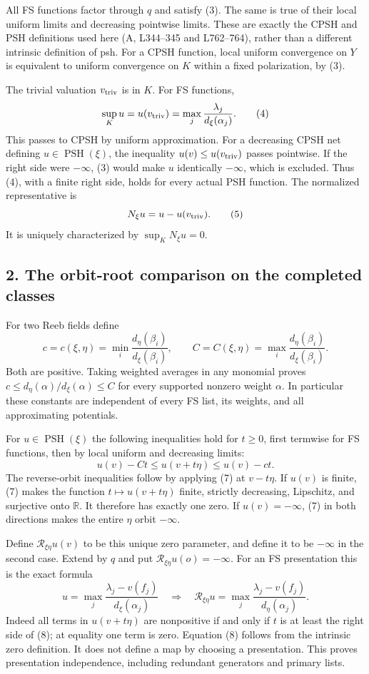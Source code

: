 \documentclass[
  11pt,
]{article}
\begin{document}
All FS functions factor through \(q\) and satisfy (3). The same is true
of their local uniform limits and decreasing pointwise limits. These are
exactly the CPSH and PSH definitions used here (A, L344--345 and
L762--764), rather than a different intrinsic definition of psh. For a
CPSH function, local uniform convergence on \(Y\) is equivalent to
uniform convergence on \(K\) within a fixed polarization, by (3).

The trivial valuation \(v_{\rm triv}\) is in \(K\). For FS functions, \[
 \sup_K u=u(v_{\rm triv})=\max_j\frac{\lambda_j}{d_\xi(\alpha_j)}.
 \tag{4}
\] This passes to CPSH by uniform approximation. For a decreasing CPSH
net defining \(u\in\operatorname{PSH}(\xi)\), the inequality
\(u(v)\leq u(v_{\rm triv})\) passes pointwise. If the right side were
\(-\infty\), (3) would make \(u\) identically \(-\infty\), which is
excluded. Thus (4), with a finite right side, holds for every actual PSH
function. The normalized representative is \[
 N_\xi u=u-u(v_{\rm triv}).                    \tag{5}
\] It is uniquely characterized by \(\sup_K N_\xi u=0\).

\subsection{2. The orbit-root comparison on the completed
classes}\label{the-orbit-root-comparison-on-the-completed-classes}

For two Reeb fields define \[
 c=c(\xi,\eta)=\min_i\frac{d_\eta(\beta_i)}{d_\xi(\beta_i)},\qquad
 C=C(\xi,\eta)=\max_i\frac{d_\eta(\beta_i)}{d_\xi(\beta_i)}.
 \tag{6}
\] Both are positive. Taking weighted averages in any monomial proves
\(c\leq d_\eta(\alpha)/d_\xi(\alpha)\leq C\) for every supported nonzero
weight \(\alpha\). In particular these constants are independent of
every FS list, its weights, and all approximating potentials.

For \(u\in\operatorname{PSH}(\xi)\) the following inequalities hold for
\(t\geq0\), first termwise for FS functions, then by local uniform and
decreasing limits: \[
 u(v)-Ct\leq u(v+t\eta)\leq u(v)-ct.           \tag{7}
\] The reverse-orbit inequalities follow by applying (7) at \(v-t\eta\).
If \(u(v)\) is finite, (7) makes the function \(t\mapsto u(v+t\eta)\)
finite, strictly decreasing, Lipschitz, and surjective onto
\(\mathbb R\). It therefore has exactly one zero. If \(u(v)=-\infty\),
(7) in both directions makes the entire \(\eta\) orbit \(-\infty\).

Define \(\mathcal R_{\xi\eta}u(v)\) to be this unique zero parameter,
and define it to be \(-\infty\) in the second case. Extend by \(q\) and
put \(\mathcal R_{\xi\eta}u(o)=-\infty\). For an FS presentation this is
the exact formula \[
 u=\max_j\frac{\lambda_j-v(f_j)}{d_\xi(\alpha_j)}
 \quad\Longrightarrow\quad
 \mathcal R_{\xi\eta}u=
 \max_j\frac{\lambda_j-v(f_j)}{d_\eta(\alpha_j)}.       \tag{8}
\] Indeed all terms in \(u(v+t\eta)\) are nonpositive if and only if
\(t\) is at least the right side of (8); at equality one term is zero.
Equation (8) follows from the intrinsic zero definition. It does not
define a map by choosing a presentation. This proves presentation
independence, including redundant generators and primary lists.
\end{document}
